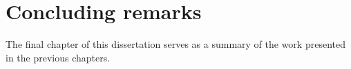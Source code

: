 \chapter{\large Concluding remarks}\label{Chap:conclusion}
\indent\indent The final chapter of this dissertation serves as a summary of the work presented in the previous chapters.

% 
%
